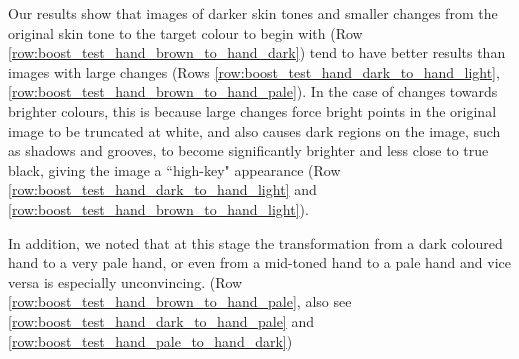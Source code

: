 Our results show that images of darker skin tones and smaller changes from the original skin tone to the target colour to begin with (Row \ref{row:boost_test_hand_brown_to_hand_dark}) tend to have better results than images with large changes (Rows \ref{row:boost_test_hand_dark_to_hand_light}, \ref{row:boost_test_hand_brown_to_hand_pale}). In the case of changes towards brighter colours, this is because large changes force bright points in the original image to be truncated at white, and also causes dark regions on the image, such as shadows and grooves, to become significantly brighter and less close to true black, giving the image a ``high-key" appearance (Row \ref{row:boost_test_hand_dark_to_hand_light} and \ref{row:boost_test_hand_brown_to_hand_light}).

In addition, we noted that at this stage the transformation from a dark coloured hand to a very pale hand, or even from a mid-toned hand to a pale hand and vice versa is especially unconvincing. (Row \ref{row:boost_test_hand_brown_to_hand_pale}, also see \ref{row:boost_test_hand_dark_to_hand_pale} and \ref{row:boost_test_hand_pale_to_hand_dark})
